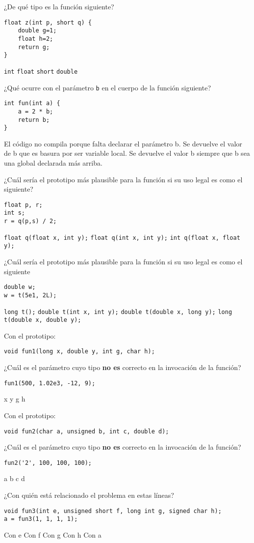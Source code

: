 
\question ¿De qué tipo es la función siguiente?\\
\begin{lstlisting}
float z(int p, short q) {
	double g=1;
	float h=2;
	return g;
}
\end{lstlisting}
\choice \texttt{int}
\correctchoice \texttt{float}
\choice \texttt{short}
\choice \texttt{double}

\question ¿Qué ocurre con el parámetro \texttt{b} en el cuerpo de la función siguiente?
\begin{lstlisting}
int fun(int a) {
	a = 2 * b;
	return b;
}
\end{lstlisting} 
\choice El código no compila porque falta declarar el parámetro b.
\choice Se devuelve el valor de b que es basura por ser variable local.
\correctchoice Se devuelve el valor b siempre que b sea una global declarada más arriba.

\question ¿Cuál sería el prototipo más plausible para la función  si su uso legal es como el siguiente?
\begin{lstlisting}
float p, r; 
int s;
r = q(p,s) / 2;	
\end{lstlisting}
\correctchoice \texttt{float q(float x, int y);}
\choice \texttt{float q(int x, int y);}
\choice \texttt{int q(float x, float y);}

\question ¿Cuál sería el prototipo más plausible para la función  si su uso legal es como el siguiente
\begin{lstlisting}
double w;
w = t(5e1, 2L);
\end{lstlisting}
\choice \texttt{long t();}
\choice \texttt{double t(int x, int y);}
\correctchoice \texttt{double t(double x, long y);}
\choice \texttt{long t(double x, double y);}

\question Con el prototipo:
\begin{lstlisting}
void fun1(long x, double y, int g, char h);
\end{lstlisting}
¿Cuál es el parámetro cuyo tipo \textbf{no es} correcto en la invocación de la función?
\begin{lstlisting}
fun1(500, 1.02e3, -12, 9);
\end{lstlisting}
\correctchoice x
\choice y
\choice g
\choice h

\question Con el prototipo:
\begin{lstlisting}
void fun2(char a, unsigned b, int c, double d);
\end{lstlisting}
¿Cuál es el parámetro cuyo tipo \textbf{no es} correcto en la invocación de la función?
\begin{lstlisting}
fun2('2', 100, 100, 100);
\end{lstlisting}
\choice a
\choice b
\choice c
\correctchoice d

\question ¿Con quién está relacionado el problema en estas líneas?
\begin{lstlisting}
void fun3(int e, unsigned short f, long int g, signed char h);
a = fun3(1, 1, 1, 1);
\end{lstlisting}
\choice Con e
\choice Con f
\choice Con g
\choice Con h
\correctchoice Con a
